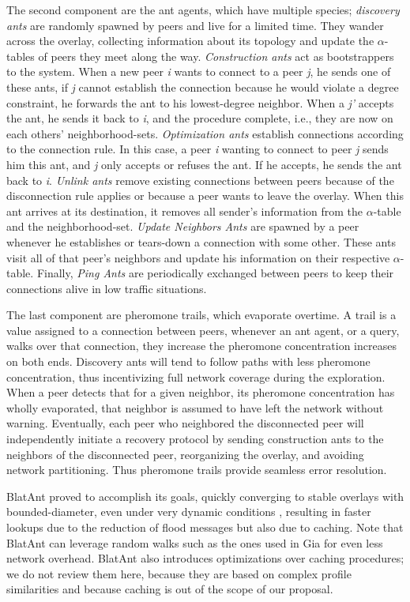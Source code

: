 \documentclass[runningheads]{llncs}
\begin{document}
The second component are the ant agents, which have multiple species; \textit{discovery ants} are randomly spawned by peers and live for a limited time. They wander across the overlay, collecting information about its topology and update the $\alpha$-tables of peers they meet along the way. \textit{Construction ants} act as bootstrappers to the system. When a new peer \textit{i} wants to connect to a peer \textit{j}, he sends one of these ants, if \textit{j} cannot establish the connection because he would violate a degree constraint, he forwards the ant to his lowest-degree neighbor. When a \textit{j'} accepts the ant, he sends it back to \textit{i}, and the procedure complete, i.e., they are now on each others' neighborhood-sets. \textit{Optimization ants} establish connections according to the connection rule. In this case, a peer \textit{i} wanting to connect to peer \textit{j} sends him this ant, and \textit{j} only accepts or refuses the ant. If he accepts, he sends the ant back to \textit{i}. \textit{Unlink ants} remove existing connections between peers because of the disconnection rule applies or because a peer wants to leave the overlay. When this ant arrives at its destination, it removes all sender's information from the $\alpha$-table and the neighborhood-set. \textit{Update Neighbors Ants} are spawned by a peer whenever he establishes or tears-down a connection with some other. These ants visit all of that peer's neighbors and update his information on their respective $\alpha$-table. Finally, \textit{Ping Ants} are periodically exchanged between peers to keep their connections alive in low traffic situations.

The last component are pheromone trails, which evaporate overtime. A trail is a value assigned to a connection between peers, whenever an ant agent, or a query, walks over that connection, they increase the pheromone concentration increases on both ends. Discovery ants will tend to follow paths with less pheromone concentration, thus incentivizing full network coverage during the exploration. When a peer detects that for a given neighbor, its pheromone concentration has wholly evaporated, that neighbor is assumed to have left the network without warning. Eventually, each peer who neighbored the disconnected peer will independently initiate a recovery protocol by sending construction ants to the neighbors of the disconnected peer, reorganizing the overlay, and avoiding network partitioning. Thus pheromone trails provide seamless error resolution.

BlatAnt proved to accomplish its goals, quickly converging to stable overlays with bounded-diameter, even under very dynamic conditions \cite{sotart}, resulting in faster lookups due to the reduction of flood messages but also due to caching. Note that BlatAnt can leverage random walks such as the ones used in Gia for even less network overhead. BlatAnt also introduces optimizations over caching procedures; we do not review them here, because they are based on complex profile similarities and because caching is out of the scope of our proposal.\newline
\end{document}
